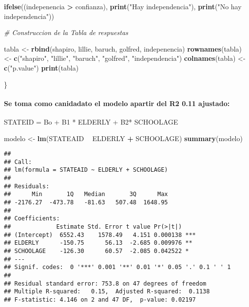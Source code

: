\documentclass[
]{article}
\newenvironment{Shaded}{\begin{snugshade}}{\end{snugshade}}
\newcommand{\CommentTok}[1]{\textcolor[rgb]{0.56,0.35,0.01}{\textit{#1}}}
\newcommand{\KeywordTok}[1]{\textcolor[rgb]{0.13,0.29,0.53}{\textbf{#1}}}
\newcommand{\NormalTok}[1]{#1}
\newcommand{\OperatorTok}[1]{\textcolor[rgb]{0.81,0.36,0.00}{\textbf{#1}}}
\newcommand{\StringTok}[1]{\textcolor[rgb]{0.31,0.60,0.02}{#1}}
\begin{document}
\begin{Shaded}
\begin{Highlighting}[]
  \KeywordTok{ifelse}\NormalTok{((indepenencia }\OperatorTok{>}\StringTok{ }\NormalTok{confianza), }\KeywordTok{print}\NormalTok{(}\StringTok{"Hay independencia"}\NormalTok{), }\KeywordTok{print}\NormalTok{(}\StringTok{"No hay independencia"}\NormalTok{))}
  
  \CommentTok{# Construccion de la Tabla de respuestas}
  
\NormalTok{  tabla <-}\StringTok{ }\KeywordTok{rbind}\NormalTok{(shapiro, lillie, baruch, golfred, indepenencia)}
  \KeywordTok{rownames}\NormalTok{(tabla) <-}\StringTok{ }\KeywordTok{c}\NormalTok{(}\StringTok{"shapiro"}\NormalTok{, }\StringTok{"lillie"}\NormalTok{, }\StringTok{"baruch"}\NormalTok{, }\StringTok{"golfred"}\NormalTok{, }\StringTok{"independencia"}\NormalTok{)}
  \KeywordTok{colnames}\NormalTok{(tabla) <-}\StringTok{ }\KeywordTok{c}\NormalTok{(}\StringTok{"p.value"}\NormalTok{)}
  \KeywordTok{print}\NormalTok{(tabla)}

  
\NormalTok{\} }
\end{Highlighting}
\end{Shaded}

\hypertarget{se-toma-como-canidadato-el-modelo-apartir-del-r2-0.11-ajustado}{%
\paragraph{Se toma como canidadato el modelo apartir del R2 0.11
ajustado:}\label{se-toma-como-canidadato-el-modelo-apartir-del-r2-0.11-ajustado}}

STATEID = Bo + B1 * ELDERLY + B2* SCHOOLAGE

\begin{Shaded}
\begin{Highlighting}[]
\NormalTok{modelo <-}\StringTok{ }\KeywordTok{lm}\NormalTok{(STATEAID }\OperatorTok{~}\StringTok{ }\NormalTok{ELDERLY }\OperatorTok{+}\StringTok{ }\NormalTok{SCHOOLAGE)}
\KeywordTok{summary}\NormalTok{(modelo)}
\end{Highlighting}
\end{Shaded}

\begin{verbatim}
## 
## Call:
## lm(formula = STATEAID ~ ELDERLY + SCHOOLAGE)
## 
## Residuals:
##      Min       1Q   Median       3Q      Max 
## -2176.27  -473.78   -81.63   507.48  1648.95 
## 
## Coefficients:
##             Estimate Std. Error t value Pr(>|t|)    
## (Intercept)  6552.43    1578.49   4.151 0.000138 ***
## ELDERLY      -150.75      56.13  -2.685 0.009976 ** 
## SCHOOLAGE    -126.30      60.57  -2.085 0.042522 *  
## ---
## Signif. codes:  0 '***' 0.001 '**' 0.01 '*' 0.05 '.' 0.1 ' ' 1
## 
## Residual standard error: 753.8 on 47 degrees of freedom
## Multiple R-squared:   0.15,  Adjusted R-squared:  0.1138 
## F-statistic: 4.146 on 2 and 47 DF,  p-value: 0.02197
\end{verbatim}
\end{document}
